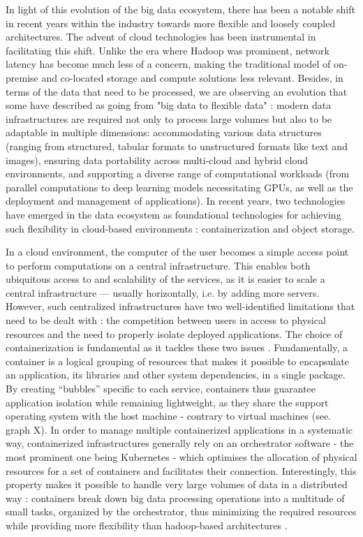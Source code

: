 In light of this evolution of the big data ecosystem, there has been a notable shift in recent years within the industry towards more flexible and loosely coupled architectures. The advent of cloud technologies has been instrumental in facilitating this shift. Unlike the era where Hadoop was prominent, network latency has become much less of a concern, making the traditional model of on-premise and co-located storage and compute solutions less relevant. Besides, in terms of the data that need to be processed, we are observing an evolution that some have described as going from "big data to flexible data" : modern data infrastructures are required not only to process large volumes but also to be adaptable in multiple dimensions: accommodating various data structures (ranging from structured, tabular formats to unstructured formats like text and images), ensuring data portability across multi-cloud and hybrid cloud environments, and supporting a diverse range of computational workloads (from parallel computations to deep learning models necessitating GPUs, as well as the deployment and management of applications)\cite{li2020big}. In recent years, two technologies have emerged in the data ecosystem as foundational technologies for achieving such flexibility in cloud-based environments : containerization and object storage. 

In a cloud environment, the computer of the user becomes a simple access point to perform computations on a central infrastructure. This enables both ubiquitous access to and scalability of the services, as it is easier to scale a central infrastructure — usually horizontally, i.e. by adding more servers. However, such centralized infrastructures have two well-identified limitations that need to be dealt with : the competition between users in access to physical resources and the need to properly isolate deployed applications. The choice of containerization is fundamental as it tackles these two issues \cite{bentaleb2022containerization}. Fundamentally, a container is a logical grouping of resources that makes it possible to encapsulate an application, its libraries and other system dependencies, in a single package. By creating “bubbles” specific to each service, containers thus guarantee application isolation while remaining lightweight, as they share the support operating system with the host machine - contrary to virtual machines (see. graph X). In order to manage multiple containerized applications in a systematic way, containerized infrastructures generally rely on an orchestrator software - the most prominent one being Kubernetes - which optimises the allocation of physical resources for a set of containers and facilitates their connection. Interestingly, this property makes it possible to handle very large volumes of data in a distributed way : containers break down big data processing operations into a multitude of small tasks, organized by the orchestrator, thus minimizing the required resources while providing more flexibility than hadoop-based architectures \cite{zhang2018comparative}.

